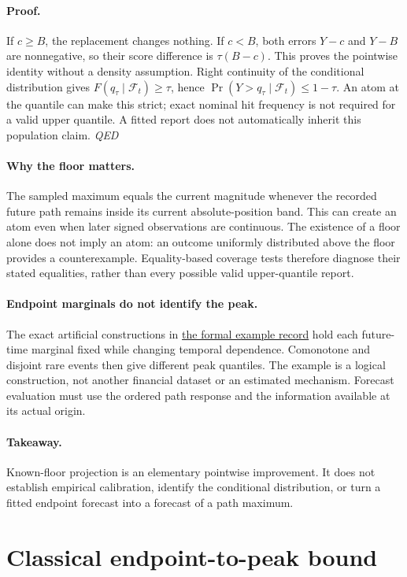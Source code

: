 \documentclass[11pt,a4paper]{article}
\begin{document}
\paragraph{Proof.}
If \(c\ge B\), the replacement changes nothing. If \(c<B\), both errors
\(Y-c\) and \(Y-B\) are nonnegative, so their score difference is
\(\tau(B-c)\). This proves the pointwise identity without a density assumption.
Right continuity of the conditional distribution gives
\(F(q_\tau\mid\mathcal F_t)\ge\tau\), hence
\(\Pr(Y>q_\tau\mid\mathcal F_t)\le1-\tau\). An atom at the quantile can make
this strict; exact nominal hit frequency is not required for a valid upper
quantile. A fitted report does not automatically inherit this population claim.
\hfill\textit{QED}

\paragraph{Why the floor matters.}
The sampled maximum equals the current magnitude whenever the recorded future
path remains inside its current absolute-position band. This can create an atom
even when later signed observations are continuous. The existence of a floor
alone does not imply an atom: an outcome uniformly distributed above the floor
provides a counterexample. Equality-based coverage tests therefore diagnose
their stated equalities, rather than every possible valid upper-quantile report.

\paragraph{Endpoint marginals do not identify the peak.}
The exact artificial constructions in \href{https://github.com/ByronLi0207/financial-mathematics-paper-20261020/blob/revision-v7-final/notes/revision-v5-novelty/theory-source.json}{the formal example record}
hold each future-time marginal fixed while changing temporal dependence.
Comonotone and disjoint rare events then give different peak quantiles.
The example is a logical construction, not another financial dataset or an
estimated mechanism. Forecast evaluation must use the ordered path response
and the information available at its actual origin.

\paragraph{Takeaway.}
Known-floor projection is an elementary pointwise improvement. It does not
establish empirical calibration, identify the conditional distribution, or turn
a fitted endpoint forecast into a forecast of a path maximum.\section{Classical endpoint-to-peak bound}\label{sup:levy}
\end{document}
